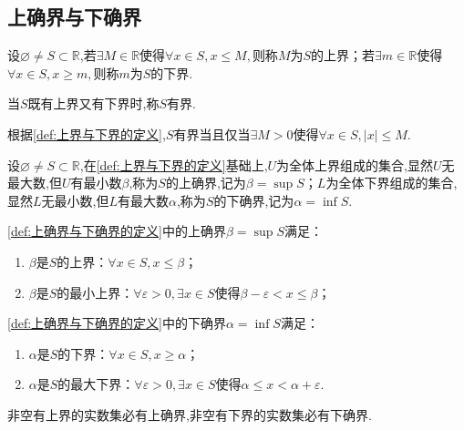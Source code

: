 \subsection{上确界与下确界}
\begin{formal}
    \begin{definition}[上界与下界的定义]\label{def:上界与下界的定义}
        设$\varnothing\neq S\subset\mathbb{R}$,若$\exists M\in\mathbb{R}$使得$\forall x\in S,x\leqslant M,$则称$M$为$S$的上界；若$\exists m \in\mathbb{R}$使得$\forall x\in S,x\geqslant m,$则称$m$为$S$的下界.
        
        当$S$既有上界又有下界时,称$S$有界.
    \end{definition}
\end{formal}
\begin{formal}
    \begin{definition}[有界的等价定义]\label{def:有界的等价定义}
        根据\cref{def:上界与下界的定义},$S$有界当且仅当$\exists M>0$使得$\forall x\in S,|x|\leqslant M$.
    \end{definition}
\end{formal}
\begin{formal}
    \begin{definition}[上确界与下确界的定义]\label{def:上确界与下确界的定义}
        设$\varnothing\neq S\subset\mathbb{R}$,在\cref{def:上界与下界的定义}基础上,$U$为全体上界组成的集合,显然$U$无最大数,但$U$有最小数$\beta$,称为$S$的上确界,记为$\beta=\sup S$；$L$为全体下界组成的集合,显然$L$无最小数,但$L$有最大数$\alpha$,称为$S$的下确界,记为$\alpha=\inf S$.
    \end{definition}
\end{formal}
\begin{formal}
    \begin{theorem}[上确界与下确界的性质]\label{thm:上确界与下确界的性质}
        \cref{def:上确界与下确界的定义}中的上确界$\beta=\sup S$满足：\begin{enumerate}[label={\textup{(\arabic*)}}]
            \item $\beta$是$S$的上界：$\forall x\in S,x\leqslant\beta$；
            \item $\beta$是$S$的最小上界：$\forall\varepsilon>0,\exists x\in S$使得$\beta-\varepsilon<x\leqslant\beta$；
        \end{enumerate}
        \cref{def:上确界与下确界的定义}中的下确界$\alpha=\inf S$满足：\begin{enumerate}[label={\textup{(\arabic*)}}]
            \item $\alpha$是$S$的下界：$\forall x\in S,x\geqslant\alpha$；
            \item $\alpha$是$S$的最大下界：$\forall\varepsilon>0,\exists x\in S$使得$\alpha\leqslant x<\alpha+\varepsilon$.
        \end{enumerate}
    \end{theorem}
\end{formal}
\begin{formal}
    \begin{theorem}\label{thm:确界存在定理/实数系连续性定理}
        非空有上界的实数集必有上确界,非空有下界的实数集必有下确界.
    \end{theorem}
\end{formal}